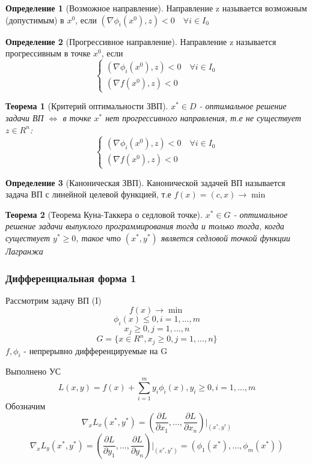 \documentclass[a4paper]{article}
\newtheorem{theorem}{Теорема}[section]
\theoremstyle{definition}
\newtheorem*{definition}{Определение}
\theoremstyle{remark}
\begin{document}
\begin{definition}[Возможное направление]
	Направление z называется возможным (допустимым) в $x^0$, если $(\nabla \phi_i(x^0), z)<0 \quad \forall i \in I_0$
\end{definition}
\begin{definition}[Прогрессивное направление]
	Направление z называется прогрессивным в точке $x^0$, если
	\[\begin{cases}
			(\nabla \phi_i(x^0), z)<0 \quad \forall i \in I_0 \\
			(\nabla f(x^0), z)<0
		\end{cases}\]
\end{definition}
\begin{theorem}[Критерий оптимальности ЗВП]
	$x^* \in D$ - оптимальное решение задачи ВП $\Leftrightarrow$
	в точке $x^*$ нет прогрессивного направления, т.е не существует $z\in R^n$:
	\[\begin{cases}
			(\nabla \phi_i(x^0), z)<0 \quad \forall i \in I_0 \\
			(\nabla f(x^0), z)<0
		\end{cases}\]
\end{theorem}
\begin{definition}[Каноническая ЗВП]
	Канонической задачей ВП называется задача ВП с линейной целевой функцией, т.е $f(x) = (c, x)\to \min$
\end{definition}
\begin{theorem}[Теорема Куна-Таккера о седловой точке]
	$x^*\in G$ - оптимальное решение задачи выпуклого программирования тогда и только тогда, когда существует $y^* \ge 0$, такое что $(x^*, y^*)$ является седловой точкой функции Лагранжа
\end{theorem}
\subsubsection*{Дифференциальная форма 1}
Рассмотрим задачу ВП  (I)
\[f(x)\to \min\]
\[\phi_i(x)\le 0, i = 1, ..., m\]
\[x_j \ge 0, j = 1, ..., n\]
\[G = \{x\in R^n, x_j \ge 0, j = 1, ..., n\}\]
$f, \phi_i$ - непрерывно дифференцируемые на G

Выполнено УС
\[L(x, y) = f(x) +\sum_{i = 1}^{m}y_i \phi_i(x), y_i\ge 0 , i = 1, \dots, m\]
Обозначим \[\nabla_x L_x(x^*, y^*) = (\frac{\partial L}{\partial x_1}, ..., \frac{\partial L}{\partial x_n})|_{(x^*, y^*)}\]
\[\nabla_x L_y(x^*, y^*) = (\frac{\partial L}{\partial y_1}, ..., \frac{\partial L}{\partial y_n})|_{(x^*, y^*)} = (\phi_1(x^*), \dots, \phi_m(x^*))\]
\end{document}
